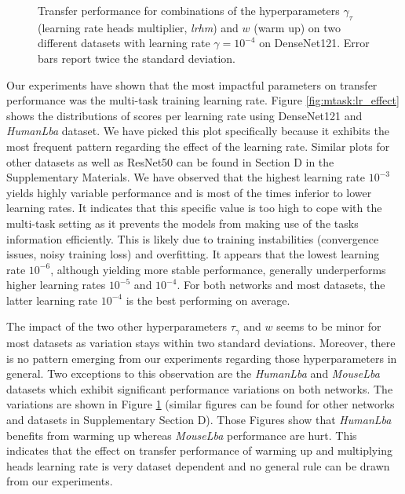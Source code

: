 \begin{figure}[t]
    \centering
    \caption{Transfer performance for combinations of the hyperparameters $\gamma_\tau$ (learning rate heads multiplier, \textit{lrhm}) and $w$ (warm up) on two different datasets with learning rate $\gamma = 10^{-4}$ on DenseNet121. Error bars report twice the standard deviation.}
    \label{fig:mtask:hyper_other_effect}
\end{figure}

Our experiments have shown that the most impactful parameters on transfer performance was the multi-task training learning rate. Figure \ref{fig:mtask:lr_effect} shows the distributions of scores per learning rate using DenseNet121 and \textit{HumanLba} dataset. We have picked this plot specifically because it exhibits the most frequent pattern regarding the effect of the learning rate. Similar plots for other datasets as well as ResNet50 can be found in Section D in the Supplementary Materials. We have observed that the highest learning rate $10^{-3}$ yields highly variable performance and is most of the times inferior to lower learning rates. It indicates that this specific value is too high to cope with the multi-task setting as it prevents the models from making use of the tasks information efficiently. This is likely due to training instabilities (convergence issues, noisy training loss) and overfitting. It appears that the lowest learning rate $10^{-6}$, although yielding more stable performance, generally underperforms higher learning rates $10^{-5}$ and $10^{-4}$. For both networks and most datasets, the latter learning rate $10^{-4}$ is the best performing on average.

The impact of the two other hyperparameters $\tau_\gamma$ and $w$ seems to be minor for most datasets as variation stays within two standard deviations. Moreover, there is no pattern emerging from our experiments regarding those hyperparameters in general. Two exceptions to this observation are the \textit{HumanLba} and \textit{MouseLba} datasets which exhibit significant performance variations on both networks. The variations are shown in Figure \ref{fig:mtask:hyper_other_effect} (similar figures can be found for other networks and datasets in Supplementary Section D). Those Figures show that \textit{HumanLba} benefits from warming up whereas \textit{MouseLba} performance are hurt. This indicates that the effect on transfer performance of warming up and multiplying heads learning rate is very dataset dependent and no general rule can be drawn from our experiments.

